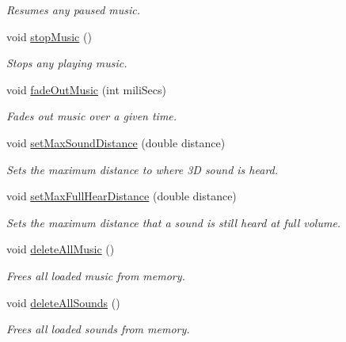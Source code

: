\begin{CompactItemize}
\begin{CompactList}\small\item\em Resumes any paused music. \item\end{CompactList}\item 
void \hyperlink{class_audio_1429d9251b77a334ac9ecb071d0936f5}{stopMusic} ()
\begin{CompactList}\small\item\em Stops any playing music. \item\end{CompactList}\item 
void \hyperlink{class_audio_3dd19311958192e1099d06dcb471e45e}{fadeOutMusic} (int miliSecs)
\begin{CompactList}\small\item\em Fades out music over a given time. \item\end{CompactList}\item 
void \hyperlink{class_audio_5d139a257adfe6cfe3b3aace9b9c4259}{setMaxSoundDistance} (double distance)
\begin{CompactList}\small\item\em Sets the maximum distance to where 3D sound is heard. \item\end{CompactList}\item 
void \hyperlink{class_audio_dad7a00ceb96ae0771e9565ec5782f94}{setMaxFullHearDistance} (double distance)
\begin{CompactList}\small\item\em Sets the maximum distance that a sound is still heard at full volume. \item\end{CompactList}\item 
void \hyperlink{class_audio_b5337dc70b4652d2065af503da72ca4f}{deleteAllMusic} ()
\begin{CompactList}\small\item\em Frees all loaded music from memory. \item\end{CompactList}\item 
void \hyperlink{class_audio_4ba9968ef82a1a0f5194898a734dfaa1}{deleteAllSounds} ()
\begin{CompactList}\small\item\em Frees all loaded sounds from memory. \item\end{CompactList}\item 

\end{CompactItemize}
